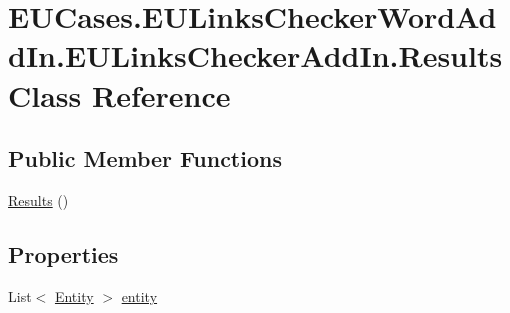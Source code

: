 \hypertarget{class_e_u_cases_1_1_e_u_links_checker_word_add_in_1_1_e_u_links_checker_add_in_1_1_results}{\section{E\+U\+Cases.\+E\+U\+Links\+Checker\+Word\+Add\+In.\+E\+U\+Links\+Checker\+Add\+In.\+Results Class Reference}
\label{class_e_u_cases_1_1_e_u_links_checker_word_add_in_1_1_e_u_links_checker_add_in_1_1_results}
}
\subsection*{Public Member Functions}
\begin{DoxyCompactItemize}
\item 
\hyperlink{class_e_u_cases_1_1_e_u_links_checker_word_add_in_1_1_e_u_links_checker_add_in_1_1_results_aaa5ee068a09102464c39bb758526d83c}{Results} ()
\end{DoxyCompactItemize}
\subsection*{Properties}
\begin{DoxyCompactItemize}
\item 
List$<$ \hyperlink{class_e_u_cases_1_1_e_u_links_checker_word_add_in_1_1_e_u_links_checker_add_in_1_1_entity}{Entity} $>$ \hyperlink{class_e_u_cases_1_1_e_u_links_checker_word_add_in_1_1_e_u_links_checker_add_in_1_1_results_af733adbd0b9b2ae91da54f67d93167b7}{entity}
\end{DoxyCompactItemize}


